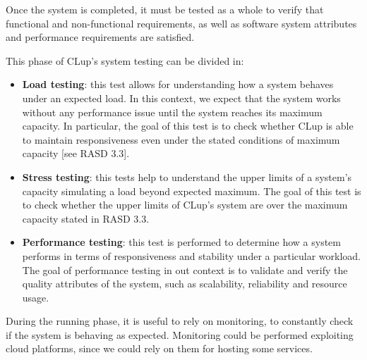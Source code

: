 \documentclass[../../main.tex]{subfiles}
\begin{document}
Once the system is completed, it must be tested as a whole to verify that functional and non-functional requirements, as well as software system attributes and performance requirements are satisfied.

This phase of CLup's system testing can be divided in:


\begin{itemize}

	\item \textbf{Load testing}: this test allows for understanding how a system behaves under an expected load. 
	In this context, we expect that the system works without any performance issue until the system reaches its maximum capacity. 
	In particular, the goal of this test is to check whether CLup is able to maintain responsiveness even under the stated conditions of maximum capacity [see RASD 3.3].

	\item \textbf{Stress testing}: this tests help to understand the upper limits of a system's capacity simulating a load beyond expected maximum. 
	The goal of this test is to check whether the upper limits of CLup's system are over the maximum capacity stated in RASD 3.3.

	\item \textbf{Performance testing}: this test is performed to determine how a system performs in terms of responsiveness and stability under a particular workload. 
	The goal of performance testing in out context is to validate and verify the quality attributes of the system, such as scalability, reliability and resource usage.
	

\end{itemize} 

During the running phase, it is useful to rely on monitoring, to constantly check if the system is behaving as expected. 
Monitoring could be performed exploiting cloud platforms, since we could rely on them for hosting some services.

\end{document}
